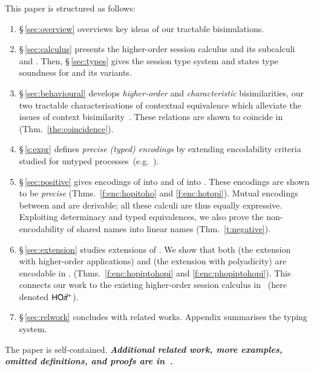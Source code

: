  This paper 
is structured as follows:
\begin{enumerate}[$\bullet$]
\item \S\,\ref{sec:overview} overviews key ideas of our tractable bisimulations.
\item \S\,\ref{sec:calculus} presents the higher-order session calculus \HOp and its 
subcalculi \HO and \sessp.  Then, \S\,\ref{sec:types} gives the session type system
and states type soundness for \HOp and its variants.
\item \S\,\ref{sec:behavioural} 
develops \emph{higher-order} and \emph{characteristic} bisimilarities, our two
tractable characterisations of contextual equivalence which 
alleviate the issues of context bisimilarity~\cite{San96H}. These 
relations are shown to coincide in \HOp (Thm.~\ref{the:coincidence}).
\item \S\,\ref{s:expr} defines \emph{precise (typed) encodings} by extending encodability criteria 
studied for
untyped processes~(e.g.~\cite{DBLP:journals/iandc/Gorla10,DBLP:conf/icalp/LanesePSS10}).
\item \S\,\ref{sec:positive} %
gives encodings of \HOp into \HO and of \HOp into \sessp.
These encodings 
are shown to be \emph{precise} (Thms.~\ref{f:enc:hopitoho} and \ref{f:enc:hotopi}).
Mutual encodings between \sessp and \HO are derivable; 
all these calculi are thus equally expressive.
Exploiting determinacy and typed equivalences,
we also prove the non-encodability of shared names
into linear names (Thm.~\ref{t:negative}).

\item \S\,\ref{sec:extension} studies extensions of \HOp. We show that 
both \HOpp (the extension with higher-order applications) 
and \pHOp (the extension with polyadicity) are encodable in \HOp.
(Thms.~\ref{f:enc:hopiptohopi} and \ref{f:enc:phopiptohopi}).
This connects our work 
to the existing
higher-order session calculus in~\cite{tlca07} (here denoted  $\mathsf{HO}{\vec{\pi}}^{+}$).

\item \S\,\ref{sec:relwork} concludes with related works. Appendix summarises the typing system. 
\end{enumerate}
\noi
The paper is self-contained. 
{\bf\em Additional related work, more examples, omitted definitions, and  proofs 
are 
in~\cite{KouzapasPY15}.} 

